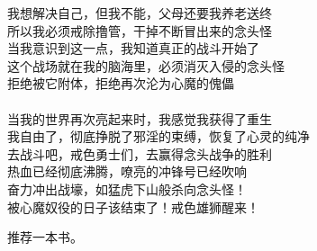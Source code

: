 \begin{adjustwidth}{-2.5em}{-2.5em}
\begin{poem}[恶念附体]
\begin{multicols}{2}
            我想解决自己，但我不能，父母还要我养老送终 \\ 所以我必须戒除撸管，干掉不断冒出来的念头怪 \\ 当我意识到这一点，我知道真正的战斗开始了 \\ 这个战场就在我的脑海里，必须消灭入侵的念头怪 \\ 拒绝被它附体，拒绝再次沦为心魔的傀儡 \\~\\
            当我的世界再次亮起来时，我感觉我获得了重生 \\ 我自由了，彻底挣脱了邪淫的束缚，恢复了心灵的纯净 \\ 去战斗吧，戒色勇士们，去赢得念头战争的胜利 \\ 热血已经彻底沸腾，嘹亮的冲锋号已经吹响 \\ 奋力冲出战壕，如猛虎下山般杀向念头怪！ \\ 被心魔奴役的日子该结束了！戒色雄狮醒来！
        \end{multicols}
    \end{poem}
\end{adjustwidth}

推荐一本书。

